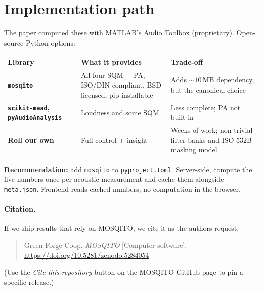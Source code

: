 \documentclass[11pt,a4paper]{article}
\begin{document}
\section{Implementation path}

The paper computed these with MATLAB's Audio Toolbox (proprietary). Open-source Python
options:

\begin{center}
\renewcommand{\arraystretch}{1.2}
\begin{tabular}{>{\bfseries}l p{6.5cm} p{4.5cm}}
  \toprule
  Library & What it provides & Trade-off \\
  \midrule
  \texttt{mosqito} &
    All four SQM + PA, ISO/DIN-compliant, BSD-licensed, pip-installable &
    Adds $\sim 10$\,MB dependency, but the canonical choice \\

  \texttt{scikit-maad}, \texttt{pyAudioAnalysis} &
    Loudness and some SQM &
    Less complete; PA not built in \\

  Roll our own &
    Full control + insight &
    Weeks of work; non-trivial filter banks and ISO 532B masking model \\
  \bottomrule
\end{tabular}
\end{center}

\noindent
\textbf{Recommendation:} add \texttt{mosqito} to \texttt{pyproject.toml}. Server-side,
compute the five numbers once per acoustic measurement and cache them alongside
\texttt{meta.json}. Frontend reads cached numbers; no computation in the browser.

\paragraph{Citation.}
If we ship results that rely on MOSQITO, we cite it as the authors request:
\begin{quote}
\small
Green Forge Coop. \textit{MOSQITO} [Computer software].
\href{https://doi.org/10.5281/zenodo.5284054}{https://doi.org/10.5281/zenodo.5284054}
\end{quote}
(Use the \emph{Cite this repository} button on the MOSQITO GitHub page to pin a
specific release.)
\end{document}
